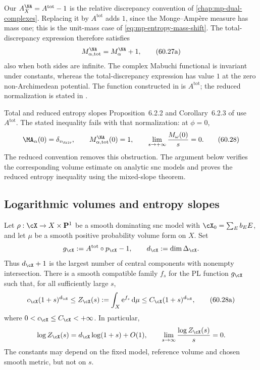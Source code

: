 Our $A_X^{\NA}=A^{\mathrm{tot}}-1$ is the relative discrepancy convention of \cref{chap:mp-dual-complexes}. Replacing it by $A^{\mathrm{tot}}$ adds $1$, since the Monge--Amp\`ere measure has mass one; this is the unit-mass case of \eqref{eq:mp-entropy-mass-shift}. The total-discrepancy expression therefore satisfies
\[
             M_{\alpha,\mathrm{tot}}^{\NA}
             =M_\alpha^{\NA}+1,
\tag{60.27a}\label{eq:mp-total-reduced-mabuchi}
\]
also when both sides are infinite. The complex Mabuchi functional is invariant under constants, whereas the total-discrepancy expression has value $1$ at the zero non-Archimedean potential. The function constructed in \cite[(3.2.4)]{MPTropicalV2} is $A^{\mathrm{tot}}$; the reduced normalization is stated in \cite[Definition~2.4.1]{MPWN25}.

\noindent\begin{minipage}{\linewidth}
\begin{warning}{Total and reduced entropy slopes}
\label{warn:mp-entropy-slopes}
Proposition~6.2.2 and Corollary~6.2.3 of \cite{MPTropicalV2} use $A^{\mathrm{tot}}$. The stated inequality fails with that normalization: at $\phi=0$,
\[
 \MA_\alpha(0)=\delta_{v_{\triv}},\qquad
 M_{\alpha,\mathrm{tot}}^{\NA}(0)=1,\qquad
 \lim_{s\to+\infty}\frac{M_\omega(0)}s=0.
 \tag{60.28}\label{eq:mp-total-slope-obstruction}
\]
The reduced convention removes this obstruction. The argument below verifies the corresponding volume estimate on analytic snc models and proves the reduced entropy inequality using the mixed-slope theorem.
\end{warning}
\end{minipage}\par

\subsection{Logarithmic volumes and entropy slopes}
\label{subsec:mp-psh-entropy-slopes}

\begin{lemma}\label{lem:mp-log-volume-test}
Let $\rho:\cX\to X\times\mathbf P^1$ be a smooth dominating snc model with $\cX_0=\sum_E b_EE$, and let $\mu$ be a smooth positive probability volume form on $X$. Set
\[
 g_{\cX}:=A^{\mathrm{tot}}\circ p_{\cX}-1,\qquad
 d_{\cX}:=\dim\Delta_{\cX}.
\]
Thus $d_{\cX}+1$ is the largest number of central components with nonempty intersection. There is a smooth compatible family $f_s$ for the PL function $g_{\cX}$ such that, for all sufficiently large $s$,
\[
 c_{\cX}(1+s)^{d_{\cX}}
 \leq Z_{\cX}(s):=\int_X\mathrm{e}^{f_s}\,\mathrm{d}\mu
 \leq C_{\cX}(1+s)^{d_{\cX}},
 \tag{60.28a}\label{eq:mp-log-volume-bound}
\]
where $0<c_{\cX}\leq C_{\cX}<+\infty$. In particular,
\[
 \log Z_{\cX}(s)=d_{\cX}\log(1+s)+O(1),\qquad
 \lim_{s\to\infty}\frac{\log Z_{\cX}(s)}s=0.
\]
The constants may depend on the fixed model, reference volume and chosen smooth metric, but not on $s$.
\end{lemma}

